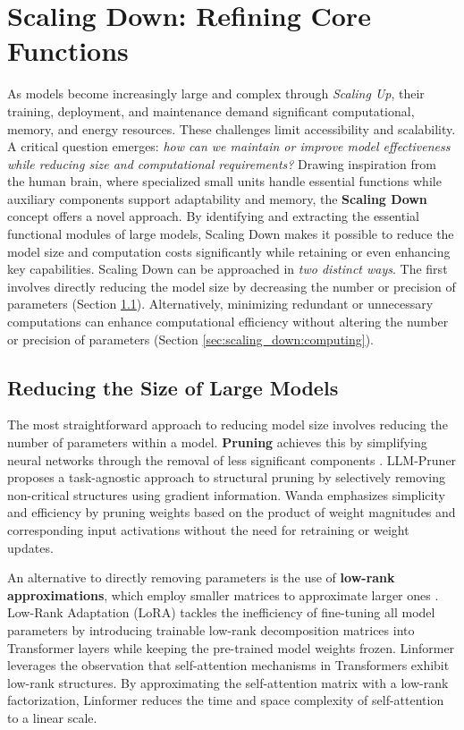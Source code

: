 \section{Scaling Down: Refining Core Functions} \label{sec:scaling_down}
As models become increasingly large and complex through \textit{Scaling Up}, their training, deployment, and maintenance demand significant computational, memory, and energy resources. These challenges limit accessibility and scalability.
A critical question emerges: \textit{how can we maintain or improve model effectiveness while reducing size and computational requirements?}
Drawing inspiration from the human brain, where specialized small units handle essential functions while auxiliary components support adaptability and memory, the \textbf{Scaling Down} concept offers a novel approach. By identifying and extracting the essential functional modules of large models, Scaling Down makes it possible to reduce the model size and computation costs significantly while retaining or even enhancing key capabilities.
Scaling Down can be approached in \textit{two distinct ways}. The first involves directly reducing the model size by decreasing the number or precision of parameters (Section \ref{sec:scaling_down:small}). 
Alternatively, minimizing redundant or unnecessary computations can enhance computational efficiency without altering the number or precision of parameters (Section \ref{sec:scaling_down:computing}).

\subsection{Reducing the Size of Large Models} \label{sec:scaling_down:small}

    The most straightforward approach to reducing model size involves reducing the number of parameters within a model. \textbf{Pruning} achieves this by simplifying neural networks through the removal of less significant components \cite{lecun1989optimal, han2015deep, molchanov2016pruning}.
    LLM-Pruner \cite{ma2023llm} proposes a task-agnostic approach to structural pruning by selectively removing non-critical structures using gradient information.
    Wanda \cite{sun2023simple} emphasizes simplicity and efficiency by pruning weights based on the product of weight magnitudes and corresponding input activations without the need for retraining or weight updates.
        
    An alternative to directly removing parameters is the use of \textbf{low-rank approximations}, which employ smaller matrices to approximate larger ones \citet{sainath2013low}. 
    Low-Rank Adaptation (LoRA) \cite{hu2021lora} tackles the inefficiency of fine-tuning all model parameters by introducing trainable low-rank decomposition matrices into Transformer layers while keeping the pre-trained model weights frozen.
    Linformer \cite{wang2020linformer} leverages the observation that self-attention mechanisms in Transformers exhibit low-rank structures. By approximating the self-attention matrix with a low-rank factorization, Linformer reduces the time and space complexity of self-attention to a linear scale.
    

